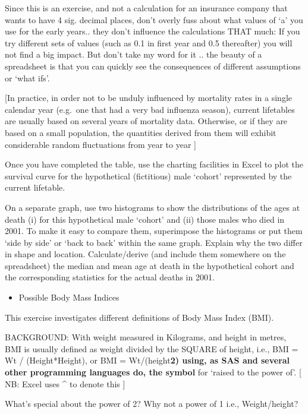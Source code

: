 \documentclass[]{book}
\providecommand{\tightlist}{%
  \setlength{\itemsep}{0pt}\setlength{\parskip}{0pt}}
\begin{document}
Since this is an exercise, and not a calculation for an insurance company that wants to have 4 sig. decimal places, don't overly fuss about what values of `a' you use for the early years.. they don't influence the calculations THAT much: If you try different sets of values (such as 0.1 in first year and 0.5 thereafter) you will not find a big impact. But don't take my word for it .. the beauty of a spreadsheet is that you can quickly see the consequences of different assumptions or `what ifs'.

{[}In practice, in order not to be unduly influenced by mortality rates in a single calendar year (e.g.~one that had a very bad influenza season), current lifetables are usually based on several years of mortality data. Otherwise, or if they are based on a small population, the quantities derived from them will exhibit considerable random fluctuations from year to year {]}

Once you have completed the table, use the charting facilities in Excel to plot the survival curve for the hypothetical (fictitious) male `cohort' represented by the current lifetable.

On a separate graph, use two histograms to show the distributions of the ages at death (i) for this hypothetical male `cohort' and (ii) those males who died in 2001. To make it easy to compare them, superimpose the histograms or put them `side by side' or `back to back' within the same graph. Explain why the two differ in shape and location. Calculate/derive (and include them somewhere on the spreadsheet) the median and mean age at death in the hypothetical cohort and the corresponding statistics for the actual deaths in 2001.

\begin{itemize}
\tightlist
\item
  Possible Body Mass Indices
\end{itemize}

This exercise investigates different definitions of Body Mass Index (BMI).

BACKGROUND: With weight measured in Kilograms, and height in metres, BMI is usually defined as weight divided by the SQUARE of height, i.e., BMI = Wt / (Height*Height), or BMI = Wt/(height\textbf{2) using, as SAS and several other programming languages do, the symbol } for `raised to the power of'. {[} NB: Excel uses \^{} to denote this {]}

What's special about the power of 2? Why not a power of 1 i.e., Weight/height?
\end{document}
